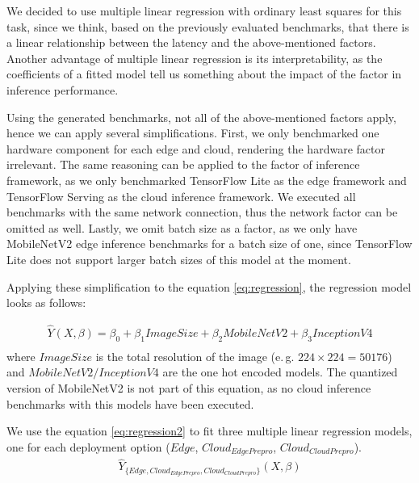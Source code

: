 We decided to use multiple linear regression with ordinary least squares for this task, since we think, based on the previously evaluated benchmarks, that there is a linear relationship between the latency and the above-mentioned factors.
Another advantage of multiple linear regression is its interpretability, as the coefficients of a fitted model tell us something about the impact of the factor in inference performance.

Using the generated benchmarks, not all of the above-mentioned factors apply, hence we can apply several simplifications.
First, we only benchmarked one hardware component for each edge and cloud, rendering the hardware factor irrelevant.
The same reasoning can be applied to the factor of inference framework, as we only benchmarked TensorFlow Lite as the edge framework and TensorFlow Serving as the cloud inference framework.
We executed all benchmarks with the same network connection, thus the network factor can be omitted as well.
Lastly, we omit batch size as a factor, as we only have MobileNetV2 edge inference benchmarks for a batch size of one, since TensorFlow Lite does not support larger batch sizes of this model at the moment.

Applying these simplification to the equation \ref{eq:regression}, the regression model looks as follows:

\begin{equation}\label{eq:regression2}
\begin{gathered}
\hat{Y}(X,\beta) = \beta_0 + \beta_1 ImageSize + \beta_2 MobileNetV2 + \beta_3 InceptionV4 \\
\end{gathered}
\end{equation}
where $ImageSize$ is the total resolution of the image (e.\,g. $224\times224=50176$) and $MobileNetV2/InceptionV4$ are the one hot encoded models. The quantized version of MobileNetV2 is not part of this equation, as no cloud inference benchmarks with this models have been executed.


We use the equation \ref{eq:regression2} to fit three multiple linear regression models, one for each deployment option ($Edge$, $Cloud_{EdgePrepro}$, $Cloud_{Cloud Prepro}$).
\begin{equation*}
\begin{gathered}
\hat{Y}_{\{Edge, Cloud_{EdgePrepro}, Cloud_{CloudPrepro}\}}(X,\beta) \\
\end{gathered}
\end{equation*}

